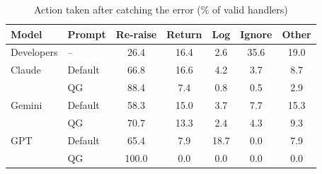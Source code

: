 \begin{table}[t]
  \centering
  \footnotesize
  \setlength{\tabcolsep}{2.5pt}
  \caption{Action taken after catching the error (\% of valid handlers)}
  \label{tab:rq2}
  \begin{tabular}{llccccc}
    \toprule
    Model & Prompt & Re-raise & Return & Log & Ignore & Other \\
    \midrule
    Developers & -- & 26.4 & 16.4 & 2.6 & 35.6 & 19.0 \\
    \midrule
    Claude & Default & 66.8 & 16.6 & 4.2 & 3.7 & 8.7 \\
     & QG & 88.4 & 7.4 & 0.8 & 0.5 & 2.9 \\
    Gemini & Default & 58.3 & 15.0 & 3.7 & 7.7 & 15.3 \\
     & QG & 70.7 & 13.3 & 2.4 & 4.3 & 9.3 \\
    GPT & Default & 65.4 & 7.9 & 18.7 & 0.0 & 7.9 \\
     & QG & 100.0 & 0.0 & 0.0 & 0.0 & 0.0 \\
    \bottomrule
  \end{tabular}
\end{table}
